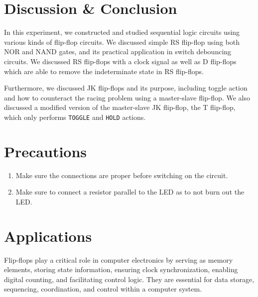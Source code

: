 \section{Discussion \& Conclusion}
In this experiment, we constructed and studied sequential logic circuits using various kinds of flip-flop circuits. We discussed simple RS flip-flop using both NOR and NAND gates, and its practical application in switch debouncing circuits. We discussed RS flip-flops with a clock signal as well as D flip-flops which are able to remove the indeterminate state in RS flip-flops.

Furthermore, we discussed JK flip-flops and its purpose, including toggle action and how to counteract the racing problem using a master-slave flip-flop. We also discussed a modified version of the master-slave JK flip-flop, the T flip-flop, which only performs \verb|TOGGLE| and \verb|HOLD| actions.

\section{Precautions}

\begin{enumerate}
    \item Make sure the connections are proper before switching on the circuit.
    \item Make sure to connect a resistor parallel to the LED as to not burn out the LED.
\end{enumerate}

\section{Applications}
Flip-flops play a critical role in computer electronics by serving as memory elements, storing state information, ensuring clock synchronization, enabling digital counting, and facilitating control logic. They are essential for data storage, sequencing, coordination, and control within a computer system.